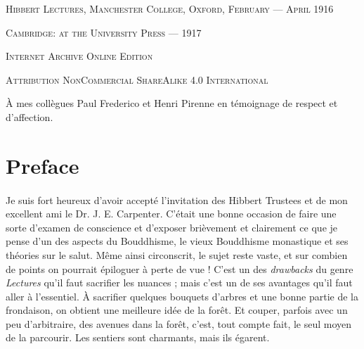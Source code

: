 \documentclass[a4paper, 11pt, oneside, english, landscape]{article}
\begin{document}
\begin{titlepage}
	\vspace{1\baselineskip}

        {\footnotesize\scshape Hibbert Lectures, Manchester College, Oxford, February --- April 1916}
	
	{\footnotesize\scshape{Cambridge: at the University Press --- 1917}}
	
	\vspace{0.25\baselineskip} %

        {\scshape\small Internet Archive Online Edition}%
    
	{\scshape\footnotesize Attribution NonCommercial ShareAlike 4.0 International } %
\end{titlepage}
\setlength{\parskip}{1mm plus1mm minus1mm}
\clearpage
\tableofcontents
\clearpage
\vspace*{\fill}
\begin{center}\footnotesize
À mes collègues Paul Frederico et Henri Pirenne en témoignage de respect et d'affection.
\end{center}
\vspace*{\fill} 
\clearpage
\section*{Preface}
\paragraph{}
Je suis fort heureux d'avoir accepté l'invitation des Hibbert Trustees et de mon excellent ami le Dr. J. E. Carpenter. C'était une bonne occasion de faire une sorte d'examen de conscience et d'exposer brièvement et clairement ce que je pense d'un des aspects du Bouddhisme, le vieux Bouddhisme monastique et ses théories sur le salut. Même ainsi circonscrit, le sujet reste vaste, et sur combien de points on pourrait épiloguer à perte de vue ! C'est un des \emph{drawbacks} du genre \emph{Lectures} qu'il faut sacrifier les nuances ; mais c'est un de ses avantages qu'il faut aller à l'essentiel. À sacrifier quelques bouquets d'arbres et une bonne partie de la frondaison, on obtient une meilleure idée de la forêt. Et couper, parfois avec un peu d'arbitraire, des avenues dans la forêt, c'est, tout compte fait, le seul moyen de la parcourir. Les sentiers sont charmants, mais ils égarent.
\end{document}
